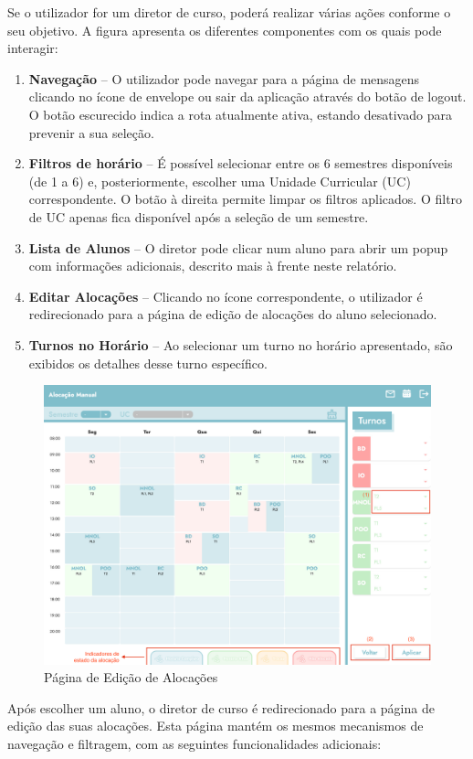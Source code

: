 \documentclass{article}
\begin{document}
Se o utilizador for um diretor de curso, poderá realizar várias ações conforme o seu objetivo. A figura apresenta os diferentes componentes com os quais pode interagir:
\begin{enumerate}
    \item \textbf{Navegação} – O utilizador pode navegar para a página de mensagens clicando no ícone de envelope ou sair da aplicação através do botão de logout. O botão escurecido indica a rota atualmente ativa, estando desativado para prevenir a sua seleção.
    \item \textbf{Filtros de horário} – É possível selecionar entre os 6 semestres disponíveis (de 1 a 6) e, posteriormente, escolher uma Unidade Curricular (UC) correspondente. O botão à direita permite limpar os filtros aplicados. O filtro de UC apenas fica disponível após a seleção de um semestre.
    \item \textbf{Lista de Alunos} – O diretor pode clicar num aluno para abrir um popup com informações adicionais, descrito mais à frente neste relatório.
    \item \textbf{Editar Alocações} – Clicando no ícone correspondente, o utilizador é redirecionado para a página de edição de alocações do aluno selecionado.
    \item \textbf{Turnos no Horário} – Ao selecionar um turno no horário apresentado, são exibidos os detalhes desse turno específico.
\end{enumerate}
\begin{figure}[H]
    \centering
    \includegraphics[width=0.75\linewidth]{manual/edit-page.png}
    \caption{Página de Edição de Alocações}
    \label{fig:enter-label}
\end{figure}
Após escolher um aluno, o diretor de curso é redirecionado para a página de edição das suas alocações. Esta página mantém os mesmos mecanismos de navegação e filtragem, com as seguintes funcionalidades adicionais:
\end{document}
